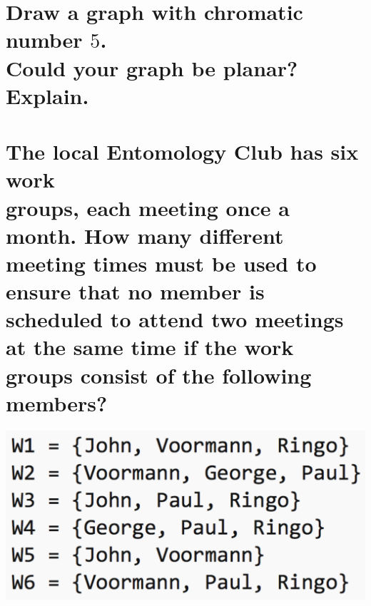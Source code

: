 \documentclass{article}
\begin{document}

\section{Draw a graph with chromatic number $5$. \\ Could your graph be planar? Explain.}
\clearpage


\section{The local Entomology Club has six work \\ groups, each meeting once a month. How many different meeting times must be used to ensure that no member is scheduled to attend two meetings at the same time if the work groups consist of the following members?}
\begin{center}
    \includegraphics[scale=0.33]{problem6.png}
\end{center}
\clearpage
\end{document}
